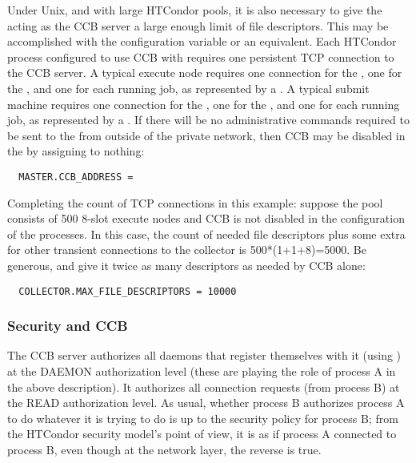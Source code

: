 Under Unix, and with large HTCondor pools,
it is also necessary to give the  acting as the CCB server
a large enough limit of file descriptors.
This may be accomplished with the configuration variable
 or an equivalent.
Each HTCondor process configured to use CCB with 
requires one persistent TCP connection to the CCB server.
A typical execute node
requires one connection for the ,
one for the ,
and one for each running job, as represented by a .
A typical submit machine
requires one connection for the ,
one for the ,
and one for each running job, as represented by a .
If there will be no administrative commands required
to be sent to the  from outside of
the private network, then CCB may be disabled in the 
by assigning  to nothing:
\begin{verbatim}
  MASTER.CCB_ADDRESS =
\end{verbatim}

Completing the count of TCP connections in this example:
suppose the pool consists of 500 8-slot
execute nodes and CCB is not disabled in the configuration of the
 processes.
In this case, the count of needed file descriptors plus some extra
for other transient connections to the collector is
500*(1+1+8)=5000.
Be generous, and give it twice as many
descriptors as needed by CCB alone:

\begin{verbatim}
  COLLECTOR.MAX_FILE_DESCRIPTORS = 10000
\end{verbatim}

\subsubsection{Security and CCB}

The CCB server authorizes all daemons that register themselves with it
(using ) at the DAEMON authorization level (these
are playing the role of process A in the above description).  It
authorizes all connection requests (from process B) at the READ
authorization level.  As usual, whether process B authorizes process A
to do whatever it is trying to do is up to the security policy for
process B; from the HTCondor security model's point of view, it is as if
process A connected to process B, even though at the network layer,
the reverse is true.

